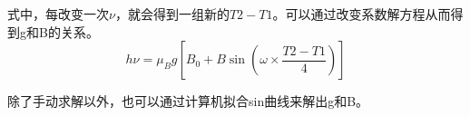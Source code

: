 \documentclass[a4paper]{article}
\begin{document}
式中，每改变一次$\nu$，就会得到一组新的$T2-T1$。可以通过改变系数解方程从而得到g和B的关系。
\begin{equation}
h\nu = \mu_B g [B_0 + B\sin(\omega\times \frac{T2-T1}{4})]
\label{eq24}
\end{equation}

除了手动求解以外，也可以通过计算机拟合sin曲线来解出g和B。

\nocite{jiaocai}

\end{document}
